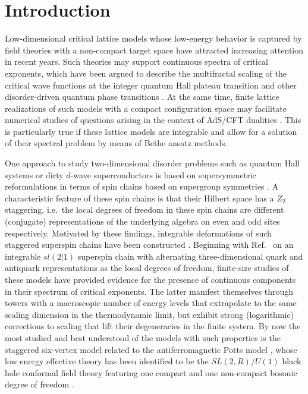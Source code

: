 \documentclass[12pt]{article}
\numberwithin{equation}{section}
\begin{document}
\section{Introduction}
Low-dimensional critical lattice models whose low-energy behavior is
captured by field theories with a non-compact target space have
attracted increasing attention in recent years.  Such theories may
support continuous spectra of critical exponents, which have been
argued to describe the multifractal scaling of the critical wave
functions at the integer quantum Hall plateau transition and other
disorder-driven quantum phase transitions \cite{Zirn19,EvMi08}. At the
same time, finite lattice realizations of such models with a compact
configuration space may facilitate numerical studies of questions
arising in the context of AdS/CFT dualities \cite{Scho06}.  This is
particularly true if these lattice models are integrable and allow for
a solution of their spectral problem by means of Bethe ansatz methods.

One approach to study two-dimensional disorder problems such as quantum
Hall systems or dirty $d$-wave superconductors is based on
supersymmetric reformulations in terms of spin chains based on supergroup
symmetries \cite{Zirn94,KoMa97,SeFi99,Gruz99}.  A characteristic
feature of these spin chains is that their Hilbert space has a
$Z_2$ staggering, i.e.\ the local degrees of freedom in these
spin chains are different (conjugate) representations of the
underlying algebra on even and odd sites respectively.  Motivated by these findings, integrable deformations of such staggered superspin chains have been constructed
\cite{Gade98,LiFo99,Gade99,EsFS05,FrMa11,FrMa12}.  Beginning
with Ref.~\cite{EsFS05} on an integrable $sl(2|1)$ superspin chain
with alternating three-dimensional quark and antiquark representations as the local
degrees of freedom, finite-size studies of these models have provided evidence for the
presence of continuous components in their spectrum of critical exponents.  The latter manifest themselves through towers with a macroscopic number of energy levels that extrapolate to the same scaling dimension in the thermodynamic limit, but exhibit strong (logarithmic) corrections to scaling that lift their degeneracies in the finite system.
By now the most studied and best understood of the models with such properties
is the staggered six-vertex model related to the antiferromagnetic
Potts model \cite{IkJS08,IkJS12,CaIk13,FrSe14,BaKL21,BKKL21a}, whose
low energy effective theory has been identified to be the
$SL(2,{R})/U(1)$ black hole conformal field theory featuring one compact and one non-compact bosonic degree of freedom \cite{Witten91}.
\end{document}
